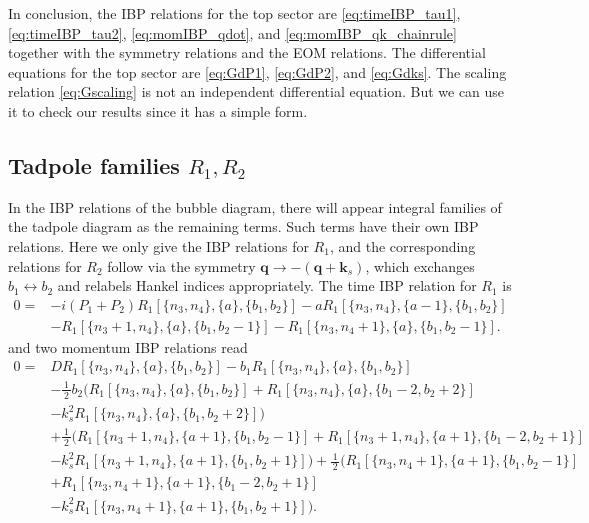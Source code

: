 \documentclass[a4paper]{article}
\newcommand{\FR}[2]{\displaystyle\frac{\,{#1}\,}{#2}}
\def\to{\rightarrow}
\begin{document}
In conclusion, the IBP relations for the top sector are \eqref{eq:timeIBP_tau1}, \eqref{eq:timeIBP_tau2}, \eqref{eq:momIBP_qdot}, and \eqref{eq:momIBP_qk_chainrule} together with the symmetry relations and the EOM relations. The differential equations for the top sector are \eqref{eq:GdP1}, \eqref{eq:GdP2}, and \eqref{eq:Gdks}. The scaling relation \eqref{eq:Gscaling} is not an independent differential equation. But we can use it to check our results since it has a simple form.




\subsection{Tadpole families $R_1,R_2$}
In the IBP relations of the bubble diagram, there will appear integral families of the tadpole diagram as the remaining terms. Such terms have their own IBP relations. Here we only give the IBP relations for $R_1$, and the corresponding relations for $R_2$ follow via the symmetry $\bm q \to -(\bm q+\bm k_s)$, which exchanges $b_1\leftrightarrow b_2$ and relabels Hankel indices appropriately. The time IBP relation for $R_1$ is
\begin{align}
	0 = & -i(P_1+P_2) R_1[\{n_3,n_4\},\{a\},\{b_1,b_2\}] - a R_1[\{n_3,n_4\},\{a-1\},\{b_1,b_2\}] \nonumber       \\
	    & - R_1[\{n_3+1,n_4\},\{a\},\{b_1,b_2-1\}] - R_1[\{n_3,n_4+1\},\{a\},\{b_1,b_2-1\}]. \label{eq:R1timeIBP}
\end{align}
and two momentum IBP relations read
\begin{align}
	0 = & D R_1[\{n_3,n_4\},\{a\},\{b_1,b_2\}] - b_1 R_1[\{n_3,n_4\},\{a\},\{b_1,b_2\}] \nonumber                    \\
	    & - \FR12 b_2\Big( R_1[\{n_3,n_4\},\{a\},\{b_1,b_2\}] + R_1[\{n_3,n_4\},\{a\},\{b_1-2,b_2+2\}] \nonumber\\
        & -k_s^2 R_1[\{n_3,n_4\},\{a\},\{b_1,b_2+2\}] \Big) \nonumber                                                \\
	    & + \FR12 \Big(
	    R_1[\{n_3+1,n_4\},\{a+1\},\{b_1,b_2-1\}] + R_1[\{n_3+1,n_4\},\{a+1\},\{b_1-2,b_2+1\}] \nonumber\\
	    &-k_s^2 R_1[\{n_3+1,n_4\},\{a+1\},\{b_1,b_2+1\}]
	    \Big)+ \FR12 \Big(
	    R_1[\{n_3,n_4+1\},\{a+1\},\{b_1,b_2-1\}] \nonumber\\
     &+ R_1[\{n_3,n_4+1\},\{a+1\},\{b_1-2,b_2+1\}]\nonumber\\
	 &-k_s^2 R_1[\{n_3,n_4+1\},\{a+1\},\{b_1,b_2+1\}]
	    \Big). \label{eq:R1momIBP}
\end{align}
\end{document}
